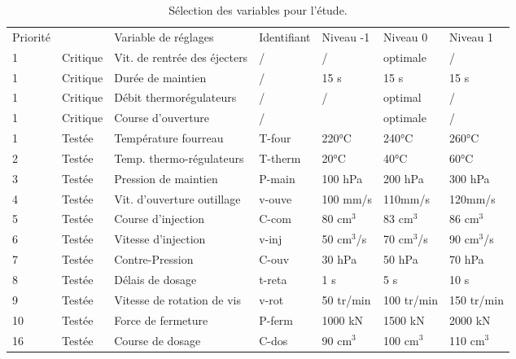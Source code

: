 \begin{table}[tbp]
    \centering
    \begin{tabular}{|l|l|l|l|l|l|l|}
        \arrayrulecolor{black}
        \hhline{-~-----}
        Priorité &          & Variable de réglages          & Identifiant & Niveau -1 & Niveau 0   & Niveau 1   \\ \hhline{=:-:=:=:=:=:=:} %
        1        & Critique & Vit. de rentrée des éjecters & /           & /         & optimale   & /          \\ \hline
        1        & Critique & Durée de maintien             & /           & 15 s      & 15 s       & 15 s       \\ \hline
        1        & Critique & Débit thermorégulateurs       & /           & /         & optimal    & /          \\ \hline
        1        & Critique & Course d'ouverture            & /           &           & optimale   & /          \\ \hline
        1        & Testée   & Température fourreau          & T-four      & 220°C     & 240°C      & 260°C      \\ \hline
        2        & Testée   & Temp. thermo-régulateurs      & T-therm     & 20°C      & 40°C       & 60°C       \\ \hline
        3        & Testée   & Pression de maintien          & P-main      & 100 hPa   & 200 hPa    & 300 hPa    \\ \hline
        4        & Testée   & Vit. d'ouverture outillage    & v-ouve      & 100 mm/s  & 110mm/s    & 120mm/s    \\ \hline
        5        & Testée   & Course d'injection            & C-com       & 80 cm$^3$ & 83 cm$^3$  & 86 cm$^3$     \\ \hline
        6        & Testée   & Vitesse d'injection           & v-inj    & 50 cm$^3$/s & 70 cm$^3$/s & 90 cm$^3$/s   \\ \hline
        7        & Testée   & Contre-Pression               & C-ouv       & 30 hPa    & 50 hPa     & 70 hPa     \\ \hline
        8        & Testée   & Délais de dosage              & t-reta      & 1 s       & 5 s        & 10 s       \\ \hline
        9        & Testée   & Vitesse de rotation de vis    & v-rot       & 50 tr/min & 100 tr/min & 150 tr/min \\ \hline
        10       & Testée   & Force de fermeture            & P-ferm      & 1000 kN   & 1500 kN    & 2000 kN    \\ \hline
        16       & Testée   & Course de dosage              & C-dos       & 90 cm$^3$ & 100 cm$^3$ & 110 cm$^3$    \\ \hline
    \end{tabular}
    \caption{Sélection des variables pour l'étude.}
    \label{tab:doe_choice}
\end{table}


